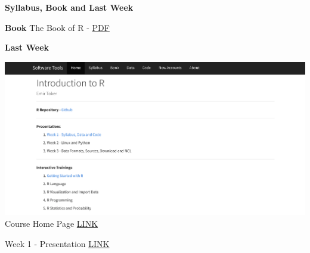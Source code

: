 \documentclass[ignorenonframetext,]{beamer}
\begin{document}
\begin{frame}{\textbf{Syllabus, Book and Last Week}}
\begin{block}{\textbf{Book}}
The Book of R -
\href{https://web.itu.edu.tr/~tokerem/The_Book_of_R.pdf}{PDF}

\end{block}

\begin{block}{\textbf{Last Week}}

\includegraphics{last_week.png} Course Home Page
\href{https://emirtoker.github.io/Software_Tools_R_Github/index.html}{LINK}

Week 1 - Presentation
\href{http://rpubs.com/emirtoker/software_tools_week1}{LINK}

\end{block}

\end{frame}
\end{document}

